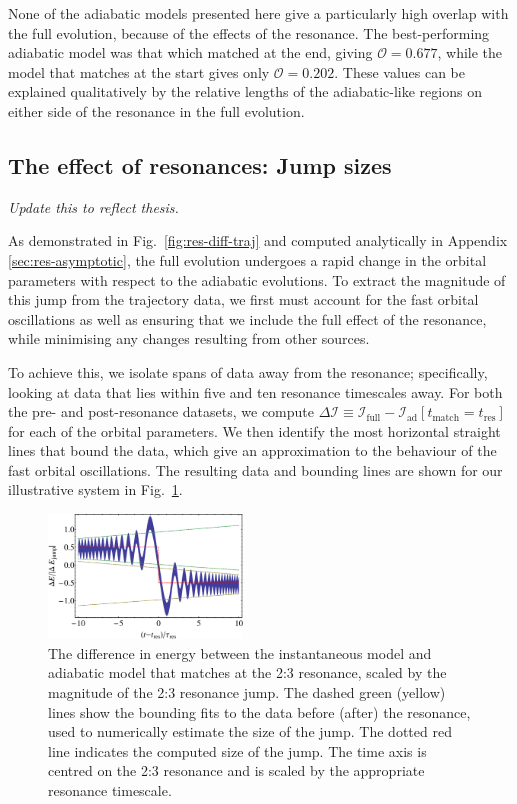 \documentclass[aps,prd,amsfonts,amssymb,amsmath,nofootinbib,showpacs,superscriptaddress,twocolumn]{revtex4}
\newcommand{\figref}[1]{Fig.\ \ref{fig:#1}}
\newcommand{\apref}[1]{Appendix \ref{sec:#1}}
\begin{document}
None of the adiabatic models presented here give a particularly high overlap with the full evolution, because of the effects of the resonance. The best-performing adiabatic model was that which matched at the end, giving $\mathcal{O} = 0.677$, while the model that matches at the start gives only $\mathcal{O} = 0.202$. These values can be explained qualitatively by the relative lengths of the adiabatic-like regions on either side of the resonance in the full evolution. 

\subsection{The effect of resonances: Jump sizes}

\emph{Update this to reflect thesis.}

As demonstrated in \figref{res-diff-traj} and computed analytically in \apref{res-asymptotic}, the full evolution undergoes a rapid change in the orbital parameters with respect to the adiabatic evolutions. To extract the magnitude of this jump from the trajectory data, we first must account for the fast orbital oscillations as well as ensuring that we include the full effect of the resonance, while minimising any changes resulting from other sources.

To achieve this, we isolate spans of data away from the resonance; specifically, looking at data that lies within five and ten resonance timescales away. For both the pre- and post-resonance datasets, we compute $\Delta \mathcal{I} \equiv \mathcal{I}_{\mathrm{full}} - \mathcal{I}_\mathrm{ad}[t_{\mathrm{match}} = t_\mathrm{res}]$ for each of the orbital parameters. We then identify the most horizontal straight lines that bound the data, which give an approximation to the behaviour of the fast orbital oscillations. The resulting data and bounding lines are shown for our illustrative system in \figref{res-jump-calc}.

\begin{figure}[htbp]
\centering
\includegraphics[width=0.46\textwidth]{Fig_res_jump_calc}
\caption{\label{fig:res-jump-calc}The difference in energy between the instantaneous model and adiabatic model that matches at the 2:3 resonance, scaled by the magnitude of the 2:3 resonance jump. The dashed green (yellow) lines show the bounding fits to the data before (after) the resonance, used to numerically estimate the size of the jump. The dotted red line indicates the computed size of the jump. The time axis is centred on the 2:3 resonance and is scaled by the appropriate resonance timescale.}
\end{figure}
\end{document}
